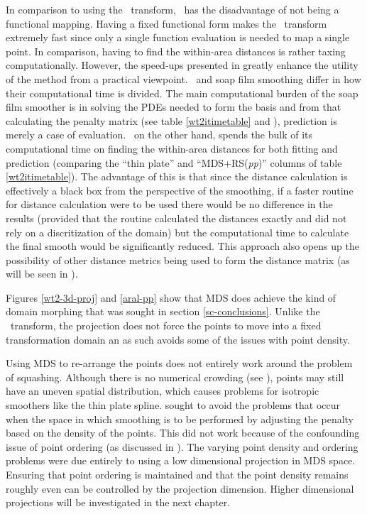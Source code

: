 In comparison to using the \sch\ transform, \mdsap\ has the disadvantage of not being a functional mapping. Having a fixed functional form makes the \sch\ transform extremely fast since only a single function evaluation is needed to map a single point. In comparison, having to find the within-area distances is rather taxing computationally. However, the speed-ups presented in  greatly enhance the utility of the method from a practical viewpoint. \mdsap\ and soap film smoothing differ in how their computational time is divided. The main computational burden of the soap film smoother is in solving the PDEs needed to form the basis and from that calculating the penalty matrix (see table \ref{wt2itimetable} and ), prediction is merely a case of evaluation. \mdsap\ on the other hand, spends the bulk of its computational time on finding the within-area distances for both fitting and prediction (comparing the ``thin plate'' and ``MDS+RS(\textit{pp})'' columns of table \ref{wt2itimetable}). The advantage of this is that since the distance calculation is effectively a black box from the perspective of the smoothing, if a faster routine for distance calculation were to be used there would be no difference in the results (provided that the routine calculated the distances exactly and did not rely on a discritization of the domain) but the computational time to calculate the final smooth would be significantly reduced. This approach also opens up the possibility of other distance metrics being used to form the distance matrix (as will be seen in ).

Figures \ref{wt2-3d-proj} and \ref{aral-pp} show that MDS does achieve the kind of domain morphing that was sought in section \ref{sc-conclusions}. Unlike the \sch\ transform, the projection does not force the points to move into a fixed transformation domain an as such avoids some of the issues with point density. 

Using MDS to re-arrange the points does not entirely work around the problem of squashing. Although there is no numerical crowding (see ), points may still have an uneven spatial distribution, which causes problems for isotropic smoothers like the thin plate spline.  sought to avoid the problems that occur when the space in which smoothing is to be performed by adjusting the penalty based on the density of the points. This did not work because of the confounding issue of point ordering (as discussed in ). The varying point density and ordering problems were due entirely to using a low dimensional projection in MDS space. Ensuring that point ordering is maintained and that the point density remains roughly even can be controlled by the projection dimension. Higher dimensional projections will be investigated in the next chapter.

